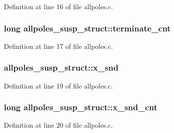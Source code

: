 Definition at line 16 of file allpoles.\+c.

\subsubsection[{\texorpdfstring{terminate\+\_\+cnt}{terminate_cnt}}]{\setlength{\rightskip}{0pt plus 5cm}long allpoles\+\_\+susp\+\_\+struct\+::terminate\+\_\+cnt}\hypertarget{structallpoles__susp__struct_a1bde6be2baac1d6534ba366a56c4de17}{}\label{structallpoles__susp__struct_a1bde6be2baac1d6534ba366a56c4de17}


Definition at line 17 of file allpoles.\+c.

\subsubsection[{\texorpdfstring{x\+\_\+snd}{x_snd}}]{ allpoles\+\_\+susp\+\_\+struct\+::x\+\_\+snd}\hypertarget{structallpoles__susp__struct_af59b0583ecdc497b601e1e575b9e2c7e}{}\label{structallpoles__susp__struct_af59b0583ecdc497b601e1e575b9e2c7e}


Definition at line 19 of file allpoles.\+c.

\subsubsection[{\texorpdfstring{x\+\_\+snd\+\_\+cnt}{x_snd_cnt}}]{\setlength{\rightskip}{0pt plus 5cm}long allpoles\+\_\+susp\+\_\+struct\+::x\+\_\+snd\+\_\+cnt}\hypertarget{structallpoles__susp__struct_a2534670add4338a67fed6d4dcfb67ed7}{}\label{structallpoles__susp__struct_a2534670add4338a67fed6d4dcfb67ed7}


Definition at line 20 of file allpoles.\+c.

